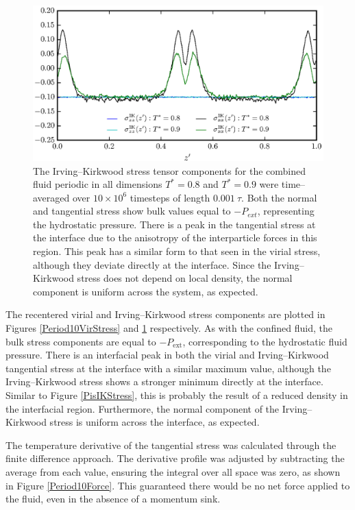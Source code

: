 \begin{figure}[h!]
\centering
\includegraphics[scale=1.0]{Period10IKStress}
\caption{The Irving--Kirkwood stress tensor components for the combined fluid periodic in all dimensions $T^{*} = 0.8$ and $T^{*} = 0.9$ were time--averaged over $10 \times 10^{6}$ timesteps of length $0.001\ \tau$.
Both the normal and tangential stress show bulk values equal to $-P_{ext}$, representing the hydrostatic pressure.
There is a peak in the tangential stress at the interface due to the anisotropy of the interparticle forces in this region.
This peak has a similar form to that seen in the virial stress, although they deviate directly at the interface.
Since the Irving--Kirkwood stress does not depend on local density, the normal component is uniform across the system, as expected.
}
\label{Period10IKStress}
\end{figure}
The recentered virial and Irving--Kirkwood stress components are plotted in Figures \ref{Period10VirStress} and \ref{Period10IKStress} respectively.
As with the confined fluid, the bulk stress components are equal to $-P_{\mathrm{ext}}$, corresponding to the hydrostatic fluid pressure.
There is an interfacial peak in both the virial and Irving--Kirkwood tangential stress at the interface with a similar maximum value, although the Irving--Kirkwood stress shows a stronger minimum directly at the interface.
Similar to Figure \ref{PisIKStress}, this is probably the result of a reduced density in the interfacial region.
Furthermore, the normal component of the Irving--Kirkwood stress is uniform across the interface, as expected.

\FloatBarrier
The temperature derivative of the tangential stress was calculated through the finite difference approach.
The derivative profile was adjusted by subtracting the average from each value, ensuring the integral over all space was zero, as shown in Figure \ref{Period10Force}.
This guaranteed there would be no net force applied to the fluid, even in the absence of a momentum sink.

